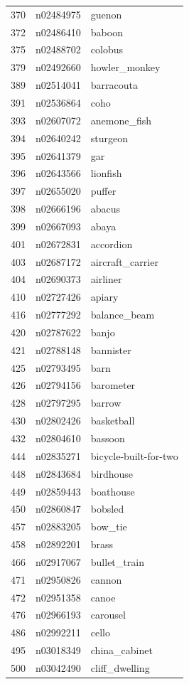 \begin{table}
\begin{tabular}{cll}
370 & n02484975 & guenon \\
372 & n02486410 & baboon \\
375 & n02488702 & colobus \\
379 & n02492660 & howler_monkey \\
389 & n02514041 & barracouta \\
391 & n02536864 & coho \\
393 & n02607072 & anemone_fish \\
394 & n02640242 & sturgeon \\
395 & n02641379 & gar \\
396 & n02643566 & lionfish \\
397 & n02655020 & puffer \\
398 & n02666196 & abacus \\
399 & n02667093 & abaya \\
401 & n02672831 & accordion \\
403 & n02687172 & aircraft_carrier \\
404 & n02690373 & airliner \\
410 & n02727426 & apiary \\
416 & n02777292 & balance_beam \\
420 & n02787622 & banjo \\
421 & n02788148 & bannister \\
425 & n02793495 & barn \\
426 & n02794156 & barometer \\
428 & n02797295 & barrow \\
430 & n02802426 & basketball \\
432 & n02804610 & bassoon \\
444 & n02835271 & bicycle-built-for-two \\
448 & n02843684 & birdhouse \\
449 & n02859443 & boathouse \\
450 & n02860847 & bobsled \\
457 & n02883205 & bow_tie \\
458 & n02892201 & brass \\
466 & n02917067 & bullet_train \\
471 & n02950826 & cannon \\
472 & n02951358 & canoe \\
476 & n02966193 & carousel \\
486 & n02992211 & cello \\
495 & n03018349 & china_cabinet \\
500 & n03042490 & cliff_dwelling \\

\end{tabular}
\end{table}
